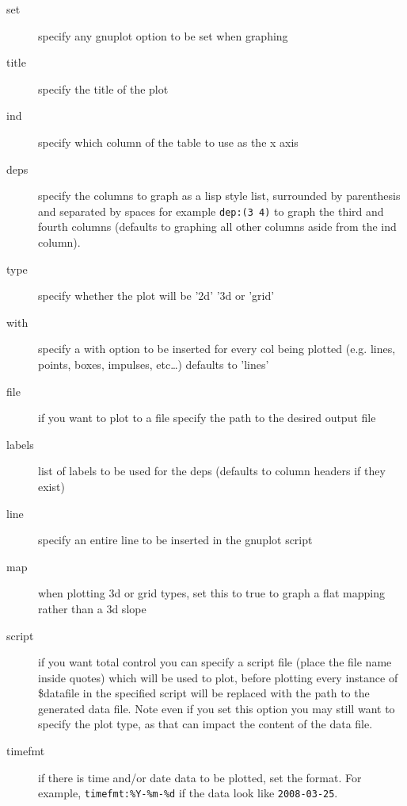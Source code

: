 \documentclass[11pt]{article}
\begin{document}
\begin{description}
\item[{set}] specify any gnuplot option to be set when graphing
\item[{title}] specify the title of the plot
\item[{ind}] specify which column of the table to use as the x axis
\item[{deps}] specify the columns to graph as a lisp style list,
surrounded by parenthesis and separated by spaces for
example \texttt{dep:(3 4)} to graph the third and fourth columns
(defaults to graphing all other columns aside from the ind
column).
\item[{type}] specify whether the plot will be '2d' '3d or 'grid'
\item[{with}] specify a with option to be inserted for every col being
plotted (e.g. lines, points, boxes, impulses, etc\ldots{})
defaults to 'lines'
\item[{file}] if you want to plot to a file specify the path to the
desired output file
\item[{labels}] list of labels to be used for the deps (defaults to column
headers if they exist)
\item[{line}] specify an entire line to be inserted in the gnuplot script
\item[{map}] when plotting 3d or grid types, set this to true to graph a
flat mapping rather than a 3d slope
\item[{script}] if you want total control you can specify a script file
(place the file name inside quotes) which will be used to
plot, before plotting every instance of \$datafile in the
specified script will be replaced with the path to the
generated data file.  Note even if you set this option you
may still want to specify the plot type, as that can
impact the content of the data file.
\item[{timefmt}] if there is time and/or date data to be plotted, set the
format.  For example, \texttt{timefmt:\%Y-\%m-\%d} if the data look
like \texttt{2008-03-25}.
\end{description}
\end{document}
